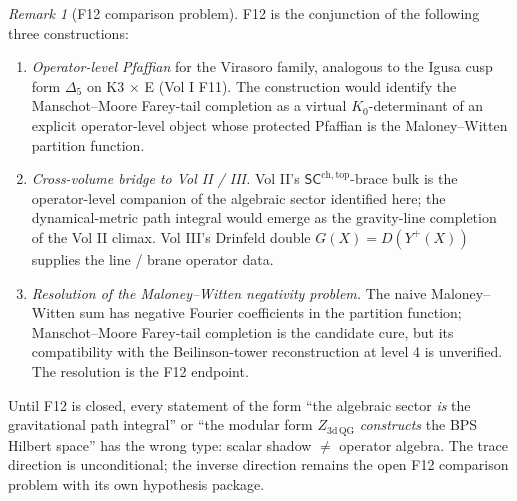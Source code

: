 \documentclass[11pt,reqno]{amsart}
\theoremstyle{definition}
\theoremstyle{remark}
\newtheorem{remark}[theorem]{Remark}
\begin{document}
\begin{remark}[F12 comparison problem]
\label{rem:f12-heal-path}
F12 is the conjunction of the following three constructions:
\begin{enumerate}[label=\textup{(\arabic*)}]
\item \emph{Operator-level Pfaffian} for the Virasoro family,
  analogous to the Igusa cusp form $\Delta_5$ on K3 $\times$ E
  (Vol I F11). The construction would identify the
  Manschot--Moore Farey-tail completion as a virtual
  $K_0$-determinant of an explicit operator-level object whose
  protected Pfaffian is the Maloney--Witten partition function.
\item \emph{Cross-volume bridge to Vol II / III.} Vol II's
  $\mathsf{SC}^{\mathrm{ch,top}}$-brace bulk is the operator-level
  companion of the algebraic sector identified here; the
  dynamical-metric path integral would emerge as the
  gravity-line completion of the Vol II climax. Vol III's
  Drinfeld double $G(X) = D(Y^+(X))$ supplies the line / brane
  operator data.
\item \emph{Resolution of the Maloney--Witten negativity problem.}
  The naive Maloney--Witten sum has negative Fourier coefficients
  in the partition function; Manschot--Moore Farey-tail completion
  is the candidate cure, but its compatibility with the
  Beilinson-tower reconstruction at level 4 is unverified. The
  resolution is the F12 endpoint.
\end{enumerate}
Until F12 is closed, every statement of the form ``the algebraic
sector \emph{is} the gravitational path integral'' or ``the
modular form $Z_{3\mathrm{d\,QG}}$ \emph{constructs} the BPS
Hilbert space'' has the wrong type: scalar shadow $\ne$ operator
algebra. The trace direction is unconditional; the inverse direction
remains the open F12 comparison problem with its own hypothesis
package.
\end{remark}
\end{document}
